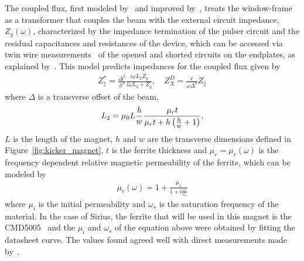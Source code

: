     The coupled flux, first modeled by~ and improved by~, treats the window-frame as a transformer that couples the beam with the external circuit impedance, $Z_g(\omega)$, characterized by the impedance termination of the pulser circuit and the residual capacitances and resistances of the device, which can be accessed via twin wire measurements~\cite{Mostacci2016} of the opened and shorted circuits on the endplates, as explained by~. This model predicts impedances for the coupled flux given by
    \begin{align}\label{eq:coupled_flux_impedance}
        Z_\parallel^* = \frac{\Delta^2}{h^2}\frac{i\omega L_2 Z_g}{i\omega L_2 + Z_g},
        \quad Z_X^D = \frac{c}{\omega\Delta^2}Z_\parallel
    \end{align}
    where $\Delta$ is a transverse offset of the beam,
    \begin{align}
        L_2 = \mu_0L\frac{h}{w}\frac{\mu_rt}{\mu_rt+h\left(\frac{h}{w}+1\right)},
    \end{align}
    $L$ is the length of the magnet, $h$ and $w$ are the transverse dimensions defined in Figure~\ref{fig:kicker_magnet}, $t$ is the ferrite thickness and $\mu_r = \mu_r(\omega)$ is the frequency dependent relative magnetic permeability of the ferrite, which can be modeled by
    \begin{align}
        \mu_r(\omega) = 1 + \frac{\mu_i}{1+i\frac{\omega}{\omega_s}}
    \end{align}
    where $\mu_i$ is the initial permeability and $\omega_s$ is the saturation frequency of the material. In the case of Sirius, the ferrite that will be used in this magnet is the CMD5005~\cite{CeramicMagnets2017} and the $\mu_i$ and $\omega_s$ of the equation above were obtained by fitting the datasheet curve. The values found agreed well with direct measurements made by~.

